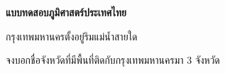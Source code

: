 \documentclass[12pt]{exam}
\begin{document}
\begin{center}
\textbf{\large แบบทดสอบภูมิศาสตร์ประเทศไทย}
\end{center}

\begin{questions}

\question[2]
กรุงเทพมหานครตั้งอยู่ริมแม่น้ำสายใด

\question[3]
จงบอกชื่อจังหวัดที่มีพื้นที่ติดกับกรุงเทพมหานครมา 3 จังหวัด

\end{questions}
\end{document}
